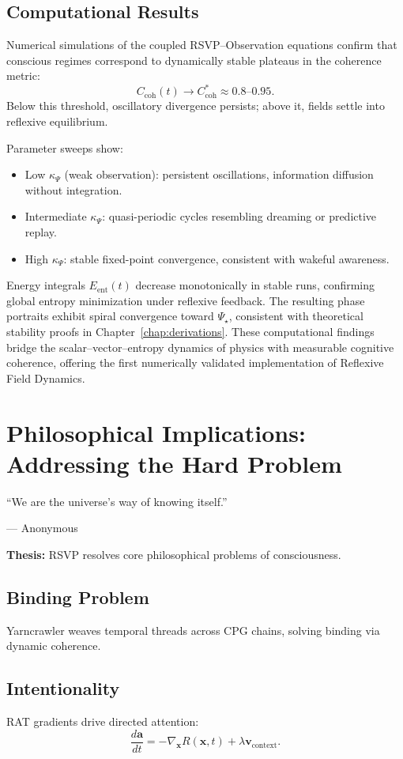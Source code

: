 \documentclass[12pt]{book}
\theoremstyle{definition}
\begin{document}
\section{Computational Results}
Numerical simulations of the coupled RSVP--Observation equations confirm that conscious regimes correspond to dynamically stable plateaus in the coherence metric:
\[
C_{\text{coh}}(t) \to C^*_{\text{coh}} \approx 0.8\text{--}0.95.
\]
Below this threshold, oscillatory divergence persists; above it, fields settle into reflexive equilibrium.  

Parameter sweeps show:
\begin{itemize}
  \item Low $\kappa_\Psi$ (weak observation): persistent oscillations, information diffusion without integration.
  \item Intermediate $\kappa_\Psi$: quasi-periodic cycles resembling dreaming or predictive replay.
  \item High $\kappa_\Psi$: stable fixed-point convergence, consistent with wakeful awareness.
\end{itemize}

Energy integrals $E_{\text{ent}}(t)$ decrease monotonically in stable runs, confirming global entropy minimization under reflexive feedback.  
The resulting phase portraits exhibit spiral convergence toward $\Psi_\star$, consistent with theoretical stability proofs in Chapter~\ref{chap:derivations}.  
These computational findings bridge the scalar–vector–entropy dynamics of physics with measurable cognitive coherence, offering the first numerically validated implementation of Reflexive Field Dynamics.


\chapter{Philosophical Implications: Addressing the Hard Problem}
\label{chap:philosophy}
\epigraph{``We are the universe’s way of knowing itself.''}{--- Anonymous}

\textbf{Thesis:} RSVP resolves core philosophical problems of consciousness.

\section{Binding Problem}
Yarncrawler weaves temporal threads across CPG chains, solving binding via dynamic coherence.

\section{Intentionality}
RAT gradients drive directed attention:
\begin{equation}
\frac{d\mathbf{a}}{dt} = -\nabla_{\mathbf{x}} R(\mathbf{x}, t) + \lambda \mathbf{v}_{\text{context}}.
\end{equation}
\end{document}
